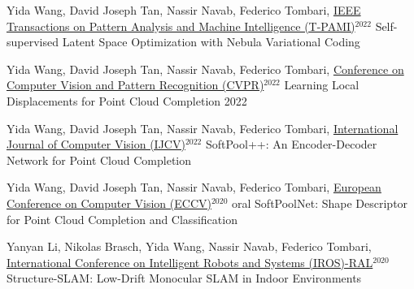 


\begin{cventries}
\begin{enumerate}[label={[\arabic*]}, leftmargin=*]

\item 
\cvpublication
{Yida Wang, David Joseph Tan, Nassir Navab, Federico Tombari, \underline{IEEE Transactions on Pattern Analysis and Machine Intelligence (T-PAMI)}$^{2022}$} %
{Self-supervised Latent Space Optimization with Nebula Variational Coding} %
{} %
{} %

\item 
\cvpublication
{Yida Wang, David Joseph Tan, Nassir Navab, Federico Tombari, \underline{Conference on Computer Vision and Pattern Recognition (CVPR)}$^{2022}$} 
{Learning Local Displacements for Point Cloud Completion} %
{2022} %
{} %
{} %

\item 
\cvpublication
{Yida Wang, David Joseph Tan, Nassir Navab, Federico Tombari, \underline{International Journal of Computer Vision (IJCV)}$^{2022}$} %
{SoftPool++: An Encoder-Decoder Network for Point Cloud Completion} %
{} %
{} %

\item 
\cvpublication
{Yida Wang, David Joseph Tan, Nassir Navab, Federico Tombari, \underline{European Conference on Computer Vision (ECCV)}$^{2020}$ oral \href{https://www.youtube.com/watch?v=zw4NlyxWlBg}{}} %
{SoftPoolNet: Shape Descriptor for Point Cloud Completion and Classification} %
{} %
{} %

\item 
\cvpublication
{Yanyan Li, Nikolas Brasch, Yida Wang, Nassir Navab, Federico Tombari, \underline{International Conference on Intelligent Robots and Systems (IROS)-RAL}$^{ 2020}$} %
{Structure-SLAM: Low-Drift Monocular SLAM in Indoor Environments} %
{} %
{} %


\end{enumerate}
\end{cventries}

